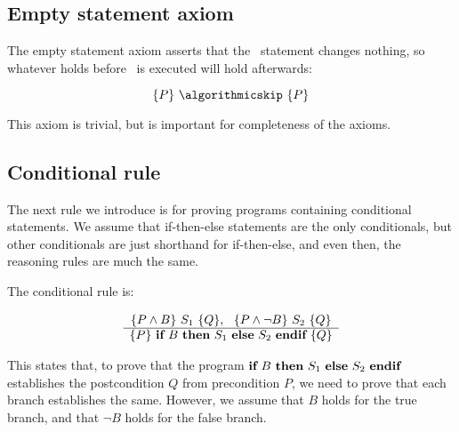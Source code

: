 \subsection{Empty statement axiom}

The empty statement axiom asserts that the \algorithmicskip\ statement changes nothing, so whatever holds before \algorithmicskip\ is executed will hold afterwards:

\begin{displaymath}
 \{P\}~ \algorithmicskip~ \{P\}
\end{displaymath}

This axiom is trivial, but is important for completeness of the axioms.

\subsection{Conditional rule}

The next rule we introduce is for proving programs containing conditional statements. We assume that if-then-else  statements are the only conditionals, but other conditionals are just shorthand for if-then-else, and even then, the reasoning rules are much the same.

The conditional rule is:

\begin{displaymath}
 \begin{array}{c}
  \{P \land B\} ~S_1~ \{Q\},~~ \{P \land \neg B\} ~S_2~ \{Q\} \\
 \hline
 \{P\}~ \algorithmicif~ B ~\algorithmicthen~ S_1 ~ \algorithmicelse~ S_2 ~ \algorithmicend\algorithmicif~\{Q\}
 \end{array}
\end{displaymath}

This states that, to prove that the program $\algorithmicif~ B ~\algorithmicthen~ S_1~ \algorithmicelse~ S_2~ \algorithmicend\algorithmicif$ establishes the postcondition $Q$  from precondition $P$, we need to prove that each branch establishes the same. However, we assume that $B$ holds for the true branch, and that $\neg B$ holds for the false branch.



